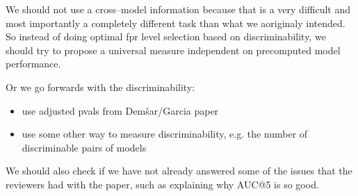 \documentclass[a4paper]{article}
\begin{document}
We should not use a cross--model information because that is a very difficult and most importantly a completely different task than what we aoriginaly intended. So instead of doing optimal fpr level selection based on discriminability, we should try to propose a universal measure independent on precomputed model performance.

Or we go forwards with the discriminability:
\begin{itemize}
	\item use adjusted pvals from Demšar/Garcia paper
	\item use some other way to measure discriminability, e.g. the number of discriminable pairs of models
\end{itemize}

We should also check if we have not already answered some of the issues that the reviewers had with the paper, such as explaining why AUC@5 is so good.



\end{document}

